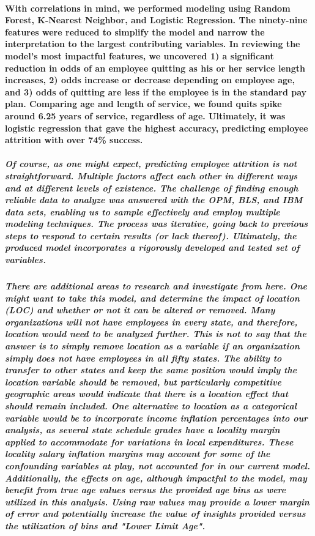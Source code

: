 \documentclass[10pt]{article}
\begin{document}
\paragraph{With correlations in mind, we performed modeling using Random Forest, K-Nearest Neighbor, and Logistic Regression.  The ninety-nine features were reduced to simplify the model and narrow the interpretation to the largest contributing variables.  In reviewing the model’s most impactful features, we uncovered 1) a significant reduction in odds of an employee quitting as his or her service length increases, 2) odds increase or decrease depending on employee age, and 3) odds of quitting are less if the employee is in the standard pay plan. Comparing age and length of service, we found quits spike around 6.25 years of service, regardless of age. Ultimately, it was logistic regression that gave the highest accuracy, predicting employee attrition with over 74\% success.}

\subparagraph{Of course, as one might expect, predicting employee attrition is not straightforward.  Multiple factors affect each other in different ways and at different levels of existence.  The challenge of finding enough reliable data to analyze was answered with the OPM, BLS, and IBM data sets, enabling us to sample effectively and employ multiple modeling techniques.  The process was iterative, going back to previous steps to respond to certain results (or lack thereof).  Ultimately, the produced model incorporates a rigorously developed and tested set of variables.}

\subparagraph{There are additional areas to research and investigate from here.  One might want to take this model, and determine the impact of location (LOC) and whether or not it can be altered or removed.  Many organizations will not have employees in every state, and therefore, location would need to be analyzed further.  This is not to say that the answer is to simply remove location as a variable if an organization simply does not have employees in all fifty states.  The ability to transfer to other states and keep the same position would imply the location variable should be removed, but particularly competitive geographic areas would indicate that there is a location effect that should remain included. One alternative to location as a categorical variable would be to incorporate income inflation percentages into our analysis, as several state schedule grades have a locality margin applied to accommodate for variations in local expenditures. These locality salary inflation margins may account for some of the confounding variables at play, not accounted for in our current model. Additionally, the effects on age, although impactful to the model, may benefit from true age values versus the provided age bins as were utilized in this analysis. Using raw values may provide a lower margin of error and potentially increase the value of insights provided versus the utilization of bins and "Lower Limit Age".}
\end{document}
